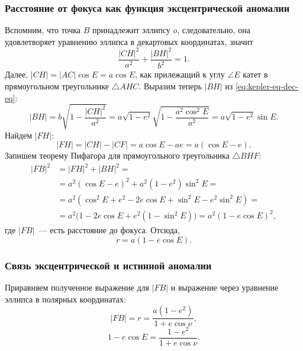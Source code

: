 \subsubsection*{Расстояние от фокуса как функция эксцентрической аномалии}
Вспомним, что точка $B$ принадлежит эллипсу $o$, следовательно, она удовлетворяет уравнению эллипса в декартовых координатах, значит
\begin{equation}
    \frac{|CH|^2}{a^2} + \frac{|BH|^2}{b^2} = 1.
    \label{eq:kepler-eq-dec-eq}
\end{equation}
Далее, $|CH| = |AC| \cos E = a \cos E$, как прилежащий к углу $\angle E$ катет в прямоугольном треугольнике $\triangle AHC$. Выразим теперь $|BH|$ из \eqref{eq:kepler-eq-dec-eq}:
\begin{equation*}
    |BH| = b\sqrt{1 - \frac{|CH|^2}{a^2}} = a \sqrt{1 - e^2} \sqrt{1 - \frac{a^2 \cos^2 E}{a^2}} = a \sqrt{1 - e^2} \sin E .
\end{equation*}
Найдем $|FH|$:
\begin{equation*}
    |FH| = |CH| - |CF| = a \cos E - a e = a (\cos E - e).
\end{equation*}
Запишем теорему Пифагора для прямоугольного треугольника $\triangle BHF$:
\begin{align*}
    |FB|^2 &= |FH|^2 + |BH|^2 = \\
    &= a^2 (\cos E - e)^2 + a^2 \left( 1 - e^2 \right) \sin^2 E = \\
    &= a^2 \left( \cos^2 E + e^2 - 2 e \cos E + \sin^2 E - e^2 \sin^2 E \right) = \\
    &= a^2 \Big( 1 - 2 e \cos E + e^2 \left( 1 - \sin^2 E \right) \Big) =  a^2 \left( 1 - e \cos E \right)^2,
\end{align*}
где $|FB|$~--- есть расстояние до фокуса. Отсюда,
\begin{equation}
	r = a (1 - e \cos E).
	\label{eq:kepler-eq-r-E}
\end{equation}
\subsubsection*{Связь эксцентрической и истинной аномалии}
Приравняем полученное выражение для $|FB|$ и выражение через уравнение эллипса в полярных координатах:
\begin{equation*}
    |FB| = r = \frac{a \left(1 - e^2 \right)}{ 1 + e \cos \nu},
\end{equation*}
\begin{equation}
    1 - e \cos E  = \frac{1 - e^2}{ 1 + e \cos \nu}.
    \label{eq:kepler-eq-E-nu-1}
\end{equation}

